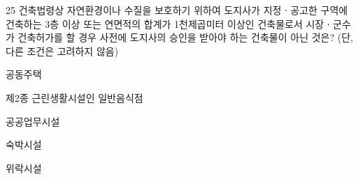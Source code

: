 \begin{question}{25}
건축법령상 자연환경이나 수질을 보호하기 위하여 도지사가 지정ㆍ공고한 구역에 건축하는 3층 이상 또는 연면적의 합계가 1천제곱미터 이상인 건축물로서 시장ㆍ군수가 건축허가를 할 경우 사전에 도지사의 승인을 받아야 하는 건축물이 아닌 것은? (단, 다른 조건은 고려하지 않음)
\begin{choices}
  \item 공동주택
  \item 제2종 근린생활시설인 일반음식점
  \item 공공업무시설
  \item 숙박시설
  \item 위락시설
\end{choices}
\end{question}
